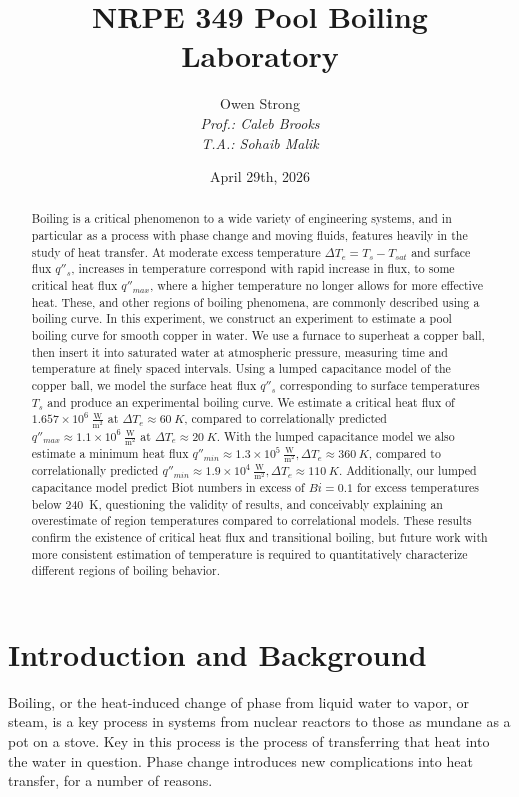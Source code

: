 \documentclass[12pt]{article}
\title{NRPE 349 Pool Boiling Laboratory}
\author{Owen Strong \\
\itshape Prof.: Caleb Brooks \\
T.A.: Sohaib Malik
}
\date{April 29th, 2026}
\newcommand{\Te}{\Delta T_e}
\newcommand{\qUnits}{\mathrm{\frac{W}{m^2}}}
\begin{document}
\maketitle
\pagebreak
{\hypersetup{linkcolor=black}\tableofcontents}
\pagebreak
{}
\begin{abstract}
    Boiling is a critical phenomenon to a wide variety of engineering systems, and in particular as a process with phase change and moving fluids, features heavily in the study of heat transfer.
    At moderate excess temperature $\Te = T_s-T_{sat}$ and surface flux $q''_s$, increases in temperature correspond with rapid increase in flux, to some critical heat flux $q''_{max}$, where a higher temperature no longer allows for more effective heat.
    These, and other regions of boiling phenomena, are commonly described using a boiling curve.
    In this experiment, we construct an experiment to estimate a pool boiling curve for smooth copper in water.
    We use a furnace to superheat a copper ball, then insert it into saturated water at atmospheric pressure, measuring time and temperature at finely spaced intervals.
    Using a lumped capacitance model of the copper ball, we model the surface heat flux $q''_s$ corresponding to surface temperatures $T_s$ and produce an experimental boiling curve.
    We estimate a critical heat flux of $1.657\times10^6~\qUnits$ at $\Te\approx60~K$, compared to correlationally predicted $q''_{max}\approx1.1\times10^6~\qUnits$ at $\Te\approx20~K$.
    With the lumped capacitance model we also estimate a minimum heat flux $q''_{min}\approx1.3\times10^5~\qUnits,\Te\approx360~K$, compared to correlationally predicted $q''_{min}\approx1.9\times10^4~\qUnits,\Te\approx110~K$.
    Additionally, our lumped capacitance model predict Biot numbers in excess of $Bi=0.1$ for excess temperatures below 240~K, questioning the validity of results, and conceivably explaining an overestimate of region temperatures compared to correlational models.
    These results confirm the existence of critical heat flux and transitional boiling, but future work with more consistent estimation of temperature is required to quantitatively characterize different regions of boiling behavior.
\end{abstract}

\section{Introduction and Background}
\FloatBarrier
Boiling, or the heat-induced change of phase from liquid water to vapor, or steam, is a key process in systems from nuclear reactors to those as mundane as a pot on a stove.
Key in this process is the process of transferring that heat into the water in question.
Phase change introduces new complications into heat transfer, for a number of reasons.\\
\end{document}
